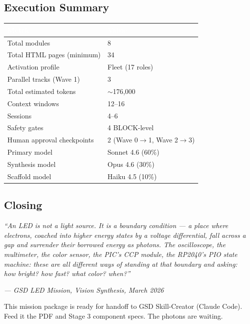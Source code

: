 \documentclass[11pt,letterpaper]{article}
\newcommand{\tableheader}[1]{\textbf{\sffamily\textcolor{white}{#1}}}
\begin{document}
\subsection{Execution Summary}

\begin{center}
\begin{tabularx}{\textwidth}{L{4cm}X}
\toprule
{}
\tableheader{Metric} & \tableheader{Value} \\
\midrule
Total modules & 8 \\
Total HTML pages (minimum) & 34 \\
Activation profile & Fleet (17 roles) \\
Parallel tracks (Wave 1) & 3 \\
Total estimated tokens & $\sim$176,000 \\
Context windows & 12--16 \\
Sessions & 4--6 \\
Safety gates & 4 BLOCK-level \\
Human approval checkpoints & 2 (Wave 0$\rightarrow$1, Wave 2$\rightarrow$3) \\
Primary model & Sonnet 4.6 (60\%) \\
Synthesis model & Opus 4.6 (30\%) \\
Scaffold model & Haiku 4.5 (10\%) \\
\bottomrule
\end{tabularx}
\end{center}

\subsection{Closing}

\begin{quotebox}
\textit{``An LED is not a light source. It is a boundary condition --- a place where electrons, coached into higher energy states by a voltage differential, fall across a gap and surrender their borrowed energy as photons. The oscilloscope, the multimeter, the color sensor, the PIC's CCP module, the RP2040's PIO state machine: these are all different ways of standing at that boundary and asking: how bright? how fast? what color? when?''}

\vspace{0.5em}
\textit{--- GSD LED Mission, Vision Synthesis, March 2026}

\vspace{0.5em}
This mission package is ready for handoff to GSD Skill-Creator (Claude Code). Feed it the PDF and Stage 3 component specs. The photons are waiting.
\end{quotebox}
\end{document}
